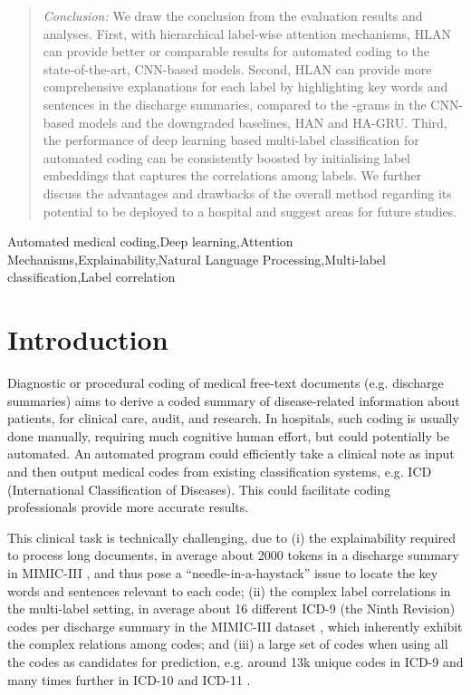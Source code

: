 \documentclass[final,5p,times,twocolumn]{elsarticle}
\begin{document}
\begin{frontmatter}
\begin{abstract}
\vskip 0.03in
\noindent\textit{Conclusion:} We draw the conclusion from the evaluation results and analyses. First, with hierarchical label-wise attention mechanisms, HLAN can provide better or comparable results for automated coding to the state-of-the-art, CNN-based models. Second, HLAN can provide more comprehensive explanations for each label by highlighting key words and sentences in the discharge summaries, compared to the -grams in the CNN-based models and the downgraded baselines, HAN and HA-GRU. Third, the performance of deep learning based multi-label classification for automated coding can be consistently boosted by initialising label embeddings that captures the correlations among labels. We further discuss the advantages and drawbacks of the overall method regarding its potential to be deployed to a hospital and suggest areas for future studies.
\end{abstract}

\begin{keyword}
Automated medical coding\sep Deep learning\sep Attention Mechanisms\sep Explainability\sep Natural Language Processing\sep Multi-label classification\sep Label correlation




\end{keyword}

\end{frontmatter}

\section{Introduction}
\label{intro}
Diagnostic or procedural coding of medical free-text documents (e.g. discharge summaries) aims to derive a coded summary of disease-related information about patients, for clinical care, audit, and research. In hospitals, such coding is usually done manually, requiring much cognitive human effort, but could potentially be automated. An automated program could efficiently take a clinical note as input and then output medical codes from existing classification systems, e.g. ICD (International Classification of Diseases). This could facilitate coding professionals provide more accurate results.

This clinical task is technically challenging, due to (i) the explainability required to process long documents, in average about 2000 tokens in a discharge summary in MIMIC-III \cite{baumel2018multi}, and thus pose a ``needle-in-a-haystack'' issue to locate the key words and sentences relevant to each code; (ii) the complex label correlations in the multi-label setting, in average about 16 different ICD-9 (the Ninth Revision) codes per discharge summary in the MIMIC-III dataset \cite{johnson_mimic-iii_2016}, which inherently exhibit the complex relations among codes; and (iii) a large set of codes when using all the codes as candidates for prediction, e.g. around 13k unique codes in ICD-9 and many times further in ICD-10 \cite{Cartwright2013} and ICD-11 \cite{Stewart2018}.
\end{document}
